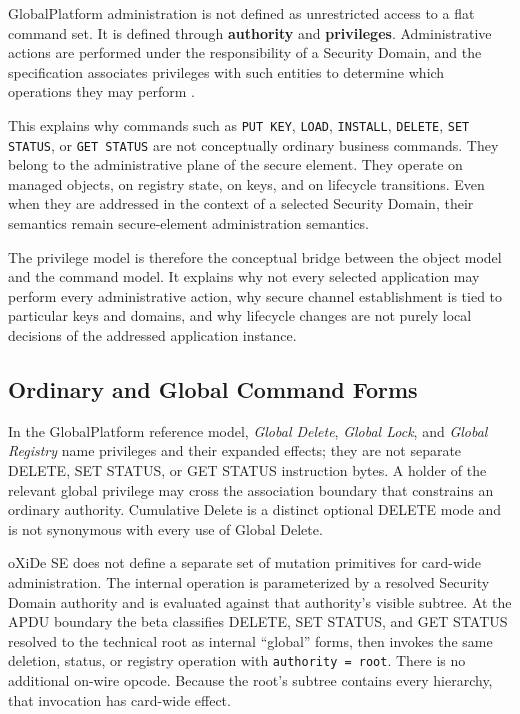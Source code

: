 GlobalPlatform administration is not defined as unrestricted access to a
flat command set. It is defined through \textbf{authority} and
\textbf{privileges}. Administrative actions are performed under the
responsibility of a Security Domain, and the specification associates
privileges with such entities to determine which operations they may
perform .

This explains why commands such as \texttt{PUT KEY}, \texttt{LOAD},
\texttt{INSTALL}, \texttt{DELETE}, \texttt{SET STATUS}, or
\texttt{GET STATUS} are not conceptually ordinary business commands.
They belong to the administrative plane of the secure element. They operate on
managed objects, on registry state, on keys, and on lifecycle
transitions. Even when they are addressed in the context of a selected
Security Domain, their semantics remain secure-element administration semantics.

The privilege model is therefore the conceptual bridge between the object
model and the command model. It explains why not every selected application
may perform every administrative action, why secure channel establishment
is tied to particular keys and domains, and why lifecycle changes are not
purely local decisions of the addressed application instance.

\subsection{Ordinary and Global Command Forms}

In the GlobalPlatform reference model, \emph{Global Delete}, \emph{Global
Lock}, and \emph{Global Registry} name privileges and their expanded effects;
they are not separate DELETE, SET STATUS, or GET STATUS instruction bytes. A
holder of the relevant global privilege may cross the association boundary
that constrains an ordinary authority. Cumulative Delete is a distinct optional
DELETE mode and is not synonymous with every use of Global Delete.

oXiDe SE does not define a separate set of mutation primitives for card-wide
administration. The internal operation is parameterized by a resolved Security
Domain authority and is evaluated against that authority's visible subtree.
At the APDU boundary the beta classifies DELETE, SET STATUS, and GET STATUS
resolved to the technical root as internal ``global'' forms, then invokes the
same deletion, status, or registry operation with \texttt{authority = root}.
There is no additional on-wire opcode. Because the root's subtree contains
every hierarchy, that invocation has card-wide effect.

